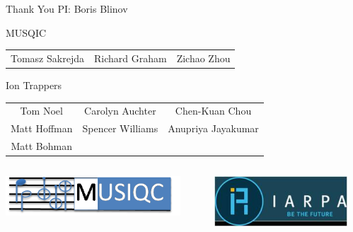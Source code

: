 \documentclass{beamer}
\begin{document}
\begin{frame}{Thank You}
PI: Boris Blinov
\begin{block}{MUSQIC}
\begin{tabular*}{0.9\textwidth}{ccc}
Tomasz Sakrejda & Richard Graham & Zichao Zhou \\
\end{tabular*}
\end{block}

\begin{block}{Ion Trappers}
\begin{tabular*}{0.9\textwidth}{ccc}
Tom Noel & Carolyn Auchter & Chen-Kuan Chou \\
Matt Hoffman & Spencer Williams & Anupriya Jayakumar \\
Matt Bohman
\end{tabular*}
\end{block}

\begin{columns}
\begin{column}{0.5\textwidth}
	\includegraphics[width=0.9\textwidth]{musiqc_logo}
\end{column}
\begin{column}{0.5\textwidth}
	\includegraphics[width=0.9\textwidth]{iarpa}
\end{column}
\end{columns}
\end{frame}
\end{document}
